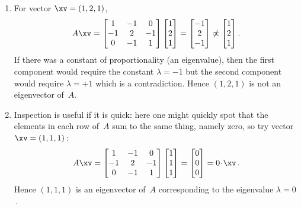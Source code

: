 \begin{example}
\begin{solution}
\begin{enumerate}
\item For vector \(\xv=(1,2,1)\),
\begin{equation*}
A\xv=\begin{bmatrix} 1&-1&0\\-1&2&-1\\0&-1&1 \end{bmatrix}
\begin{bmatrix} 1\\2\\1 \end{bmatrix}
=\begin{bmatrix} -1\\2\\-1  \end{bmatrix}
\not\propto\begin{bmatrix} 1\\2\\1 \end{bmatrix}.
\end{equation*}
If there was a constant of proportionality (an eigenvalue), then the first component would require the constant \(\lambda=-1\) but the second component would require \(\lambda=+1\) which is a contradiction.
Hence \((1,2,1)\) is not an eigenvector of~\(A\).

\item Inspection is useful if it is quick: here one might quickly spot that the elements in each row of~\(A\) sum to the same thing, namely zero, so  try vector \(\xv=(1,1,1)\)\,:
\begin{equation*}
A\xv=\begin{bmatrix} 1&-1&0\\-1&2&-1\\0&-1&1 \end{bmatrix}
\begin{bmatrix} 1\\1\\1 \end{bmatrix}
=\begin{bmatrix} 0\\0\\0  \end{bmatrix}
=0\cdot\xv\,.
\end{equation*}
Hence \((1,1,1)\) is an eigenvector of~\(A\) corresponding to the eigenvalue \(\lambda=0\)\,.

\end{enumerate}
\end{solution}
\end{example}



